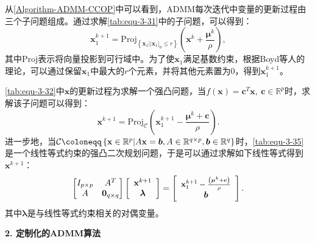 从\autoref{Algorithm-ADMM-CCOP}中可以看到，ADMM每次迭代中变量的更新过程由三个子问题组成。通过求解\autoref{tab:equ-3-31}中的子问题，可以得到：
\begin{equation}
    \label{tab:equ-3-34}
    \mathbf{x}_{1}^{k+1}=\mathrm{Proj}_{\left\{ \mathbf{x}_1||\mathbf{x}_1|_0\le r \right\}}\left( \mathbf{x}^k+\frac{\boldsymbol{\mu }^k}{\rho} \right), 
\end{equation}
其中$\mathrm{Proj}$表示将向量投影到可行域中。为了使$\mathbf{x}_1$满足基数约束，根据Boyd等人的理论\cite{boyd2011distributed}，可以通过保留$\mathbf{x}_1$中最大的$r$个元素，并将其他元素置为0，得到$\mathbf{x}_{1}^{k+1}$。

\autoref{tab:equ-3-32}中$\mathbf{x}$的更新过程为求解一个强凸问题，当$f(\mathbf{x})=\boldsymbol{c}^T\mathbf{x},\ \boldsymbol{c}\in \mathbb{R} ^p$时，求解该子问题可以得到：
\begin{equation}
    \label{tab:equ-3-35}
    \mathbf{x}^{k+1}=\mathrm{Proj}_{\mathcal{C}}\left( \mathbf{x}_{1}^{k+1}-\frac{\boldsymbol{\mu }^k+\boldsymbol{c}}{\rho} \right). 
\end{equation}
进一步地，当$\mathcal{C} \coloneqq \left\{ \mathbf{x}\in \mathbb{R} ^p|A\mathbf{x}=\boldsymbol{b}\ \\ ,A\in \mathbb{R} ^{q\times p},\boldsymbol{b}\in \mathbb{R} ^q \right\} $时，\autoref{tab:equ-3-35}是一个线性等式约束的强凸二次规划问题，于是可以通过求解如下线性等式得到$\mathbf{x}^{k+1}$：
\begin{equation}
    \label{tab:equ-3-36}
    \left[ \begin{matrix}
        I_{p\times p}&		A^T\\
        A&		\mathbf{0}_{q\times q}\\
    \end{matrix} \right] \left[ \begin{array}{c}
        \mathbf{x}^{k+1}\\
        \boldsymbol{\lambda }\\
    \end{array} \right] =\left[ \begin{array}{c}
        \mathbf{x}_{1}^{k+1}-\small{\frac{\left( \boldsymbol{\mu }^k+\boldsymbol{c} \right)}{\rho}}\\
        \boldsymbol{b}\\
    \end{array} \right].
\end{equation}
其中$\boldsymbol{\lambda }$是与线性等式约束相关的对偶变量。

\textbf{2. 定制化的ADMM算法}

